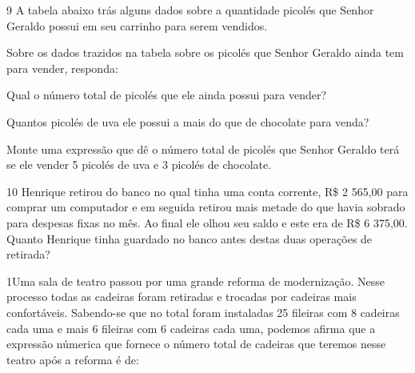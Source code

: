\num{9} A tabela abaixo trás alguns dados sobre a quantidade picolés que
Senhor Geraldo possui em seu carrinho para serem vendidos.


Sobre os dados trazidos na tabela sobre os picolés que Senhor Geraldo
ainda tem para vender, responda:

\begin{escolha}
\item
  Qual o número total de picolés que ele ainda possui para vender?


\item
  Quantos picolés de uva ele possui a mais do que de chocolate para
  venda?


\item
  Monte uma expressão que dê o número total de picolés que Senhor
  Geraldo terá se ele vender 5 picolés de uva e 3 picolés de chocolate.

\end{escolha}


\num{10} Henrique retirou do banco no qual tinha uma conta corrente, R\$ 2
565,00 para comprar um computador e em seguida retirou mais metade do
que havia sobrado para despesas fixas no mês. Ao final ele olhou seu
saldo e este era de R\$ 6 375,00. Quanto Henrique tinha guardado no
banco antes destas duas operações de retirada?




\num{1}Uma sala de teatro passou por uma grande reforma de modernização.
Nesse processo todas as cadeiras foram retiradas e trocadas por cadeiras
mais confortáveis. Sabendo-se que no total foram instaladas 25 fileiras
com 8 cadeiras cada uma e mais 6 fileiras com 6 cadeiras cada uma,
podemos afirma que a expressão númerica que fornece o número total de
cadeiras que teremos nesse teatro após a reforma é de:

